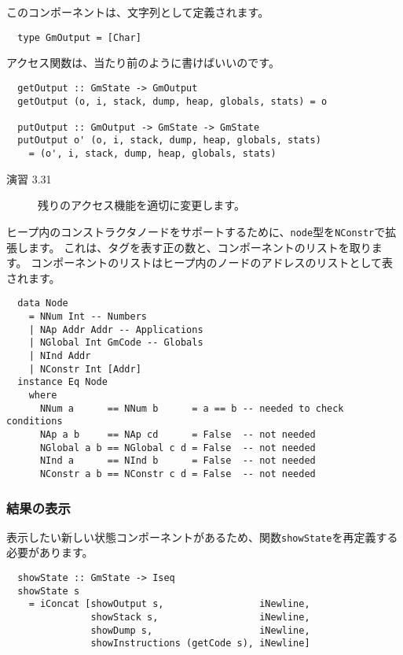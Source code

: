 \documentclass{jarticle}
\begin{document}
このコンポーネントは、文字列として定義されます。

\begin{verbatim}
  type GmOutput = [Char]
\end{verbatim}

アクセス関数は、当たり前のように書けばいいのです。

\begin{verbatim}
  getOutput :: GmState -> GmOutput
  getOutput (o, i, stack, dump, heap, globals, stats) = o

  putOutput :: GmOutput -> GmState -> GmState
  putOutput o' (o, i, stack, dump, heap, globals, stats)
    = (o', i, stack, dump, heap, globals, stats)
\end{verbatim}

\begin{description}
	\item[演習 3.31] 残りのアクセス機能を適切に変更します。
\end{description}

ヒープ内のコンストラクタノードをサポートするために、\texttt{node}型を\texttt{NConstr}で拡張します。
これは、タグを表す正の数と、コンポーネントのリストを取ります。
コンポーネントのリストはヒープ内のノードのアドレスのリストとして表されます。

\begin{verbatim}
  data Node
    = NNum Int -- Numbers
    | NAp Addr Addr -- Applications
    | NGlobal Int GmCode -- Globals
    | NInd Addr
    | NConstr Int [Addr]
  instance Eq Node
    where
      NNum a      == NNum b      = a == b -- needed to check conditions
      NAp a b     == NAp cd      = False  -- not needed
      NGlobal a b == NGlobal c d = False  -- not needed
      NInd a      == NInd b      = False  -- not needed
      NConstr a b == NConstr c d = False  -- not needed
\end{verbatim}

\subsubsection{結果の表示}

表示したい新しい状態コンポーネントがあるため、関数\texttt{showState}を再定義する必要があります。

\begin{verbatim}
  showState :: GmState -> Iseq
  showState s
    = iConcat [showOutput s,                 iNewline,
               showStack s,                  iNewline,
               showDump s,                   iNewline,
               showInstructions (getCode s), iNewline]
\end{verbatim}
\end{document}
